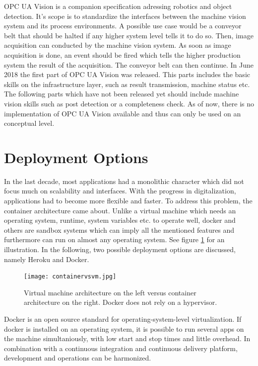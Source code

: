 OPC UA Vision is a companion specification adressing robotics and object detection. \cite{VDMA2018OPCSpecification} It's scope is to standardize the interfaces between the machine vision system and its process environments. A possible use case would be a conveyor belt that should be halted if any higher system level tells it to do so. Then, image acquisition can conducted by the machine vision system. As soon as image acquisition is done, an event should be fired which tells the higher production system the result of the acquisition. The conveyor belt can then continue. In June 2018 the first part of OPC UA Vision was released. This parts includes the basic skills on the infrastructure layer, such as result transmission, machine status etc. The following parts which have not been released yet should include machine vision skills such as post detection or a completeness check. As of now, there is no implementation of OPC UA Vision available and thus can only be used on an conceptual level.

\section {Deployment Options}
\label{deploymentoptions}
In the last decade, most applications had a monolithic character which did not focus much on scalability and interfaces. With the progress in digitalization, applications had to become more flexible and faster. To address this problem, the container architecture came about. Unlike a virtual machine which needs an operating system, runtime, system variables etc. to operate well, docker and others are sandbox systems which can imply all the mentioned features and furthermore can run on almost any operating system. See figure \ref{container} for an illustration. In the following, two possible deployment options are discussed, namely Heroku and Docker.\cite{WurbsLastvisited2018-11-272017DockerVeraendern}

\begin{figure}[ht]
	\centering
  \texttt{[image: containervsvm.jpg]}
	\caption{Virtual machine architecture on the left versus container architecture on the right. Docker does not rely on a hypervisor.\cite{WurbsLastvisited2018-11-272017DockerVeraendern}}
	\label{container}
\end{figure}

Docker is an open source standard for operating-system-level virtualization. If docker is installed on an operating system, it is possible to run several apps on the machine simultaniously, with low start and stop times and little overhead. In combination with a continuous integration and continuous delivery platform, development and operations can be harmonized.


